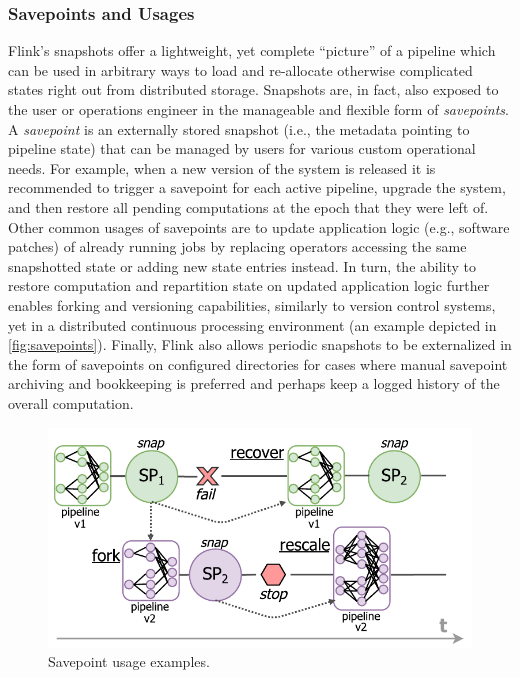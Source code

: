 \subsubsection{Savepoints and Usages}
\label{sec:savepoints}
Flink's snapshots offer a lightweight, yet complete ``picture'' of a pipeline which can be used in arbitrary ways to load and re-allocate otherwise complicated states right out from distributed storage. Snapshots are, in fact, also exposed to the user or operations engineer in the manageable and flexible form of \emph{savepoints}. A \emph{savepoint} is an externally stored snapshot (i.e., the metadata pointing to pipeline state) that can be managed by users for various custom operational needs. For example, when a new version of the system is released it is recommended to trigger a savepoint for each active pipeline, upgrade the system, and then restore all pending computations at the epoch that they were left of. Other common usages of savepoints are to update application logic (e.g., software patches) of already running jobs by replacing operators accessing the same snapshotted state or adding new state entries instead. In turn, the ability to restore computation and repartition state on updated application logic further enables forking and versioning capabilities, similarly to version control systems, yet in a distributed continuous processing environment (an example depicted in \autoref{fig:savepoints}). Finally, Flink also allows periodic snapshots to be externalized in the form of savepoints on configured directories for cases where manual savepoint archiving and bookkeeping is preferred and perhaps keep a logged history of the overall computation. 

\begin{figure}[h]
\centering
\includegraphics[width=\textwidth / 2]{figures/savepointsexamples.pdf}
\caption{Savepoint usage examples.} 
\label{fig:savepoints}
\vspace{-4mm}
\end{figure}

